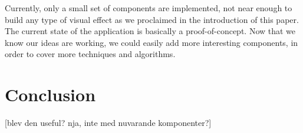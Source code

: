 Currently, only a small set of components are implemented, not near enough to build any type of visual effect as we proclaimed in the introduction of this paper. The current state of the application is basically a proof-of-concept. Now that we know our ideas are working, we could easily add more interesting components, in order to cover more techniques and algorithms.

\chapter{Conclusion}

[blev den useful? nja, inte med nuvarande komponenter?]

